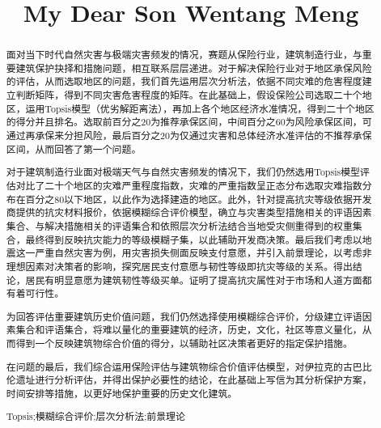 \documentclass{mcmthesis}
\title{My Dear Son Wentang Meng}
\begin{document}
\begin{abstract}
\par
面对当下时代自然灾害与极端灾害频发的情况，赛题从保险行业，建筑制造行业，与重要建筑保护抉择和措施问题，相互联系层层递进。对于解决保险行业对于地区承保风险的评估，从而选取地区的问题，我们首先运用层次分析法，依据不同灾难的危害程度建立判断矩阵，得到不同灾害危害程度的矩阵。在此基础上，假设保险公司选取二十个地区，运用Topsis模型（优劣解距离法），再加上各个地区经济水准情况，得到二十个地区的得分并且排名。选取前百分之20为推荐承保区间，中间百分之60为风险承保区间，可通过再承保来分担风险，最后百分之20为仅通过灾害和总体经济水准评估的不推荐承保区间，从而回答了第一个问题。\par
对于建筑制造行业面对极端天气与自然灾害频发的情况下，我们仍然选用Topsis模型评估对比了二十个地区的灾难严重程度指数，灾难的严重指数呈正态分布选取灾难指数分布在百分之80以下地区，以此作为选择建造的地区。此外，针对提高抗灾等级依据开发商提供的抗灾材料报价，依据模糊综合评价模型，确立与灾害类型措施相关的评语因素集合、与解决措施相关的评语集合和依照层次分析法结合当地受灾侧重得到的权重集合，最终得到反映抗灾能力的等级模糊子集，以此辅助开发商决策。最后我们考虑以地震这一严重自然灾害为例，用灾害损失侧面反映支付意愿，并引入前景理论，以考虑非理想因素对决策者的影响，探究居民支付意愿与韧性等级即抗灾等级的关系。得出结论，居民有明显意愿为建筑韧性等级买单。证明了提高抗灾属性对于市场和人道方面都有着可行性。\par
为回答评估重要建筑历史价值问题，我们仍然选择使用模糊综合评价，分级建立评语因素集合和评语集合，将难以量化的重要建筑的经济，历史，文化，社区等意义量化，从而得到一个反映建筑物综合价值的得分，以辅助社区决策者更好的指定保护措施。\par
在问题的最后，我们综合运用保险评估与建筑物综合价值评估模型，对伊拉克的古巴比伦遗址进行分析评估，并得出保护必要性的结论，在此基础上写信为其分析保护方案，时间安排等措施，以更好地保护重要的历史文化建筑。\par
\begin{keywords}
Topsis;模糊综合评价;层次分析法;前景理论
\end{keywords}
\end{abstract}
\maketitle

 \tableofcontents
 \newpage



\end{document}
